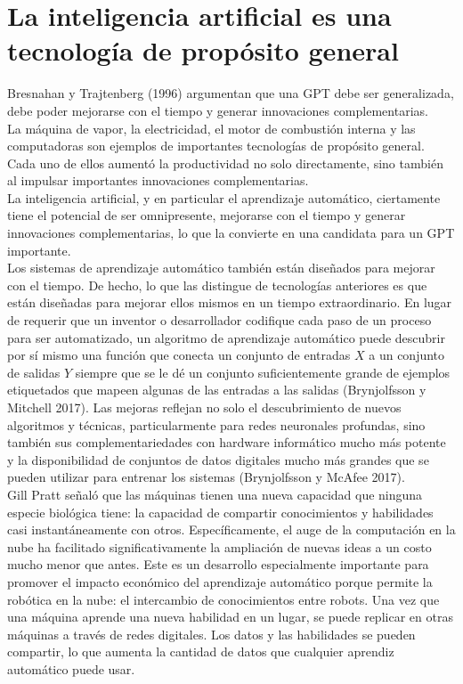 \section{La inteligencia artificial es una tecnología de propósito general}
Bresnahan y Trajtenberg (1996) argumentan que una GPT debe ser generalizada, debe poder mejorarse con el tiempo y generar innovaciones complementarias.\\
La máquina de vapor, la electricidad, el motor de combustión interna y las computadoras son ejemplos de importantes tecnologías de propósito general. Cada uno de ellos aumentó la productividad no solo directamente, sino también al impulsar importantes innovaciones complementarias.\\
La inteligencia artificial, y en particular el aprendizaje automático, ciertamente tiene el potencial de ser omnipresente, mejorarse con el tiempo y generar innovaciones complementarias, lo que la convierte en una candidata para un GPT importante.\\
Los sistemas de aprendizaje automático también están diseñados para mejorar con el tiempo. De hecho, lo que las distingue de tecnologías anteriores es que están diseñadas para mejorar ellos mismos en un tiempo extraordinario. En lugar de requerir que un inventor o desarrollador codifique cada paso de un proceso para ser automatizado, un algoritmo de aprendizaje automático puede descubrir por sí mismo una función que conecta un conjunto de entradas $X$ a un conjunto de salidas $Y$ siempre que se le dé un conjunto suficientemente grande de ejemplos etiquetados que mapeen algunas de las entradas a las salidas (Brynjolfsson y Mitchell 2017). Las mejoras reflejan no solo el descubrimiento de nuevos algoritmos y técnicas, particularmente para redes neuronales profundas, sino también sus complementariedades con hardware informático mucho más potente y la disponibilidad de conjuntos de datos digitales mucho más grandes que se pueden utilizar para entrenar los sistemas (Brynjolfsson y McAfee 2017).\\
Gill Pratt señaló que las máquinas tienen una nueva capacidad que ninguna especie biológica tiene: la capacidad de compartir conocimientos y habilidades casi instantáneamente con otros. Específicamente, el auge de la computación en la nube ha facilitado significativamente la ampliación de nuevas ideas a un costo mucho menor que antes. Este es un desarrollo especialmente importante para promover el impacto económico del aprendizaje automático porque permite la robótica en la nube: el intercambio de conocimientos entre robots. Una vez que una máquina aprende una nueva habilidad en un lugar, se puede replicar en otras máquinas a través de redes digitales. Los datos y las habilidades se pueden compartir, lo que aumenta la cantidad de datos que cualquier aprendiz automático puede usar.\\


